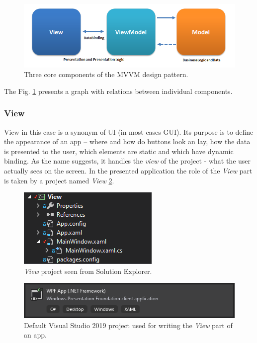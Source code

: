     \begin{figure}[H]
        \centering
        \includegraphics[width=\textwidth]{img/MVVMPattern.png}
        \caption{Three core components of the MVVM design pattern.}
        \label{fig:mvvm_pattern}
    \end{figure}
    The Fig. \ref{fig:mvvm_pattern} presents a graph with relations between individual components.
    
    \subsubsection{View} 
        View in this case is a synonym of UI (in most cases GUI). Its purpose is to define the appearance of an app -- where and how do buttons look an lay, how the data is presented to the user, which elements are static and which have dynamic binding. As the name suggests, it handles the \textit{view} of the project - what the user actually sees on the screen.
        In the presented application the role of the \textit{View} part is taken by a project named \textit{View} \ref{fig:view}.
        
        \begin{figure}[H]
            \centering
            \includegraphics{img/view.png}
            \caption{\textit{View} project seen from Solution Explorer.}
            \label{fig:view}
        \end{figure}
        
        \begin{figure}[H]
            \centering
            \includegraphics{img/view_wpfApp.png}
            \caption{Default Visual Studio 2019 project used for writing the \textit{View} part of an app.}
            \label{fig:view_wpfApp}
        \end{figure}
        

